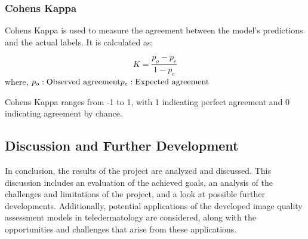 \subsubsection{Cohens Kappa}
\label{subsub:CohensKappa}
Cohens Kappa is used to measure the agreement between the model’s predictions and the actual labels. It is calculated as: \par
\begin{equation}
    K = \frac{p_o - p_e}{1 - p_e}
\end{equation}
\noindent
where, \newline
$p_o: \text{Observed agreement} \\ p_e: \text{Expected agreement}$ \par
\vspace{\baselineskip}
\noindent
Cohens Kappa ranges from -1 to 1, with 1 indicating perfect agreement and 0 indicating agreement by chance. \par

\subsection{Discussion and Further Development}
\label{sub:DiscussionDevelopment}
In conclusion, the results of the project are analyzed and discussed. This discussion includes an evaluation of the achieved goals, an analysis of the challenges and limitations of the project, and a look at possible further developments. Additionally, potential applications of the developed image quality assessment models in teledermatology are considered, along with the opportunities and challenges that arise from these applications. \par